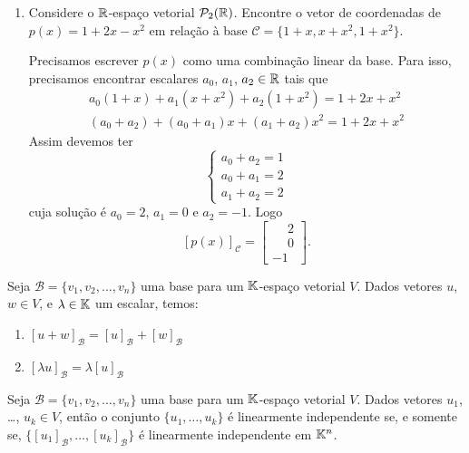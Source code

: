 \begin{exemplos}
\begin{enumerate}
    \item Considere o $\mathbb{R}$-espaço vetorial $\mathcal{P}_2(\mathbb{R})$. Encontre o vetor de coordenadas de $p(x) = 1 + 2x - x^2$ em relação à base $\mathcal{C} = \{1 + x, x + x^2, 1 + x^2\}$.
      \begin{solucao}
        Precisamos escrever $p(x)$ como uma combinação linear da base. Para isso, precisamos encontrar escalares $a_0$, $a_1$, $a_2 \in \mathbb{R}$ tais que
        \begin{align*}
          a_0(1 + x) + a_1(x + x^2) + a_2(1 + x^2) = 1 + 2x + x^2\\
          (a_0 + a_2) + (a_0 + a_1)x + (a_1 + a_2)x^2 = 1 + 2x + x^2
        \end{align*}
        Assim devemos ter
        \[
          \begin{cases}
            a_0 + a_2 = 1\\
            a_0 + a_1 = 2\\
            a_1 + a_2 = 2
          \end{cases}
        \]
        cuja solução é $a_0 = 2$, $a_1 = 0$ e $a_2 = -1$. Logo
        \[
          [p(x)]_\mathcal{C} = \begin{bmatrix}\phantom{-}2\\\phantom{-}0\\-1\end{bmatrix}.
        \]
      \end{solucao}
  \end{enumerate}
\end{exemplos}

\begin{teorema}
  Seja $\mathcal{B} = \{v_1, v_2, \dots, v_n\}$ uma base para um $\mathbb{K}$-espaço vetorial $V$. Dados vetores $u$, $w \in V$, e $\lambda \in \mathbb{K}$ um escalar, temos:
  \begin{enumerate}[label={\roman*})]
    \item $[u + w]_\mathcal{B} = [u]_\mathcal{B} + [w]_\mathcal{B}$

    \item $[\lambda u]_\mathcal{B} = \lambda[u]_\mathcal{B}$
  \end{enumerate}
\end{teorema}

\begin{teorema}
  Seja $\mathcal{B} = \{v_1, v_2, \dots, v_n\}$ uma base para um $\mathbb{K}$-espaço vetorial $V$. Dados vetores $u_1$, \dots, $u_k \in V$, então o conjunto $\{u_1, \dots, u_k\}$ é linearmente independente se, e somente se,  $\{[u_1]_\mathcal{B}, \dots, [u_k]_\mathcal{B}\}$ é linearmente independente em $\mathbb{K}^n$.
\end{teorema}

